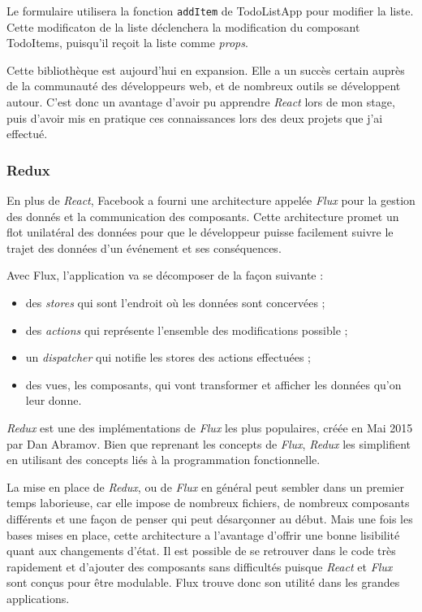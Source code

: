 Le formulaire utilisera la fonction \texttt{addItem} de TodoListApp pour
modifier la liste. Cette modificaton de la liste déclenchera la
modification du composant TodoItems, puisqu'il reçoit la liste comme
\emph{props}.

\bigskip

Cette bibliothèque est aujourd'hui en expansion. Elle a un succès
certain auprès de la communauté des développeurs web, et de nombreux
outils se développent autour. C'est donc un avantage d'avoir pu
apprendre \emph{React} lors de mon stage, puis d'avoir mis en pratique
ces connaissances lors des deux projets que j'ai effectué.

\bigskip

\subsubsection{Redux}\label{redux}

\bigskip

En plus de \emph{React}, Facebook a fourni une architecture appelée
\emph{Flux} pour la gestion des donnés et la communication des
composants. Cette architecture promet un flot unilatéral des données
pour que le développeur puisse facilement suivre le trajet des données
d'un événement et ses conséquences.

\bigskip

Avec Flux, l'application va se décomposer de la façon suivante :

\begin{itemize}
\tightlist
\item
  des \emph{stores} qui sont l'endroit où les données sont concervées ;
\item
  des \emph{actions} qui représente l'ensemble des modifications
  possible ;
\item
  un \emph{dispatcher} qui notifie les stores des actions effectuées ;
\item
  des vues, les composants, qui vont transformer et afficher les données
  qu'on leur donne.
\end{itemize}

\bigskip

\emph{Redux} est une des implémentations de \emph{Flux} les plus
populaires, créée en Mai 2015 par Dan Abramov. Bien que reprenant les
concepts de \emph{Flux}, \emph{Redux} les simplifient en utilisant des
concepts liés à la programmation fonctionnelle.

\bigskip

La mise en place de \emph{Redux}, ou de \emph{Flux} en général peut
sembler dans un premier temps laborieuse, car elle impose de nombreux
fichiers, de nombreux composants différents et une façon de penser qui
peut désarçonner au début. Mais une fois les bases mises en place, cette
architecture a l'avantage d'offrir une bonne lisibilité quant aux
changements d'état. Il est possible de se retrouver dans le code très
rapidement et d'ajouter des composants sans difficultés puisque
\emph{React} et \emph{Flux} sont conçus pour être modulable. Flux trouve
donc son utilité dans les grandes applications.


